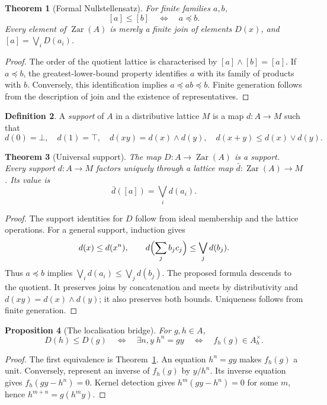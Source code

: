 \documentclass[11pt]{amsart}
\newtheorem{theorem}{Theorem}[section]
\newtheorem{proposition}[theorem]{Proposition}
\theoremstyle{definition}
\newtheorem{definition}[theorem]{Definition}
\theoremstyle{remark}
\newcommand{\Zar}{\operatorname{Zar}}
\newcommand{\units}[1]{#1^{\times}}
\begin{document}
\begin{theorem}[Formal Nullstellensatz]\label{thm:null}
For finite families $a,b$,
\[
 [a]\leq[b]\quad\Longleftrightarrow\quad a\preceq b.
\]
Every element of $\Zar(A)$ is merely a finite join of elements $D(x)$,
and $[a]=\bigvee_iD(a_i)$.
\end{theorem}
\begin{proof}
The order of the quotient lattice is characterised by
$[a]\wedge[b]=[a]$. If $a\preceq b$, the greatest-lower-bound property
identifies $a$ with its family of products with $b$. Conversely, this
identification implies $a\preceq ab\preceq b$. Finite generation follows
from the description of join and the existence of representatives.
\end{proof}

\begin{definition}
A \emph{support} of $A$ in a distributive lattice $M$ is a map $d:A\to M$
such that
\[
 d(0)=\bot,\quad d(1)=\top,\quad d(xy)=d(x)\wedge d(y),\quad
 d(x+y)\leq d(x)\vee d(y).
\]
\end{definition}

\begin{theorem}[Universal support]\label{thm:support}
The map $D:A\to\Zar(A)$ is a support. Every support $d:A\to M$ factors
uniquely through a lattice map $\bar d:\Zar(A)\to M$. Its value is
\[
 \bar d([a])=\bigvee_i d(a_i).
\]
\end{theorem}
\begin{proof}
The support identities for $D$ follow from ideal membership and the
lattice operations. For a general support, induction gives
\[
 d(x)\leq d(x^n),\qquad
 d\Bigl(\sum_j b_jc_j\Bigr)\leq\bigvee_jd(b_j).
\]
Thus $a\preceq b$ implies $\bigvee_i d(a_i)\leq\bigvee_jd(b_j)$.
The proposed formula descends to the quotient. It preserves joins by
concatenation and meets by distributivity and $d(xy)=d(x)\wedge d(y)$;
it also preserves both bounds. Uniqueness follows from finite generation.
\end{proof}

\begin{proposition}[The localisation bridge]\label{prop:bridge}
For $g,h\in A$,
\[
 D(h)\leq D(g)
 \quad\Longleftrightarrow\quad
 \exists n,y\;h^n=gy
 \quad\Longleftrightarrow\quad f_h(g)\in\units{A_h}.
\]
\end{proposition}
\begin{proof}
The first equivalence is Theorem~\ref{thm:null}. An equation $h^n=gy$
makes $f_h(g)$ a unit. Conversely, represent an inverse of $f_h(g)$ by
$y/h^n$. Its inverse equation gives $f_h(gy-h^n)=0$. Kernel detection
gives $h^m(gy-h^n)=0$ for some $m$, hence
$h^{m+n}=g(h^my)$.
\end{proof}
\end{document}
